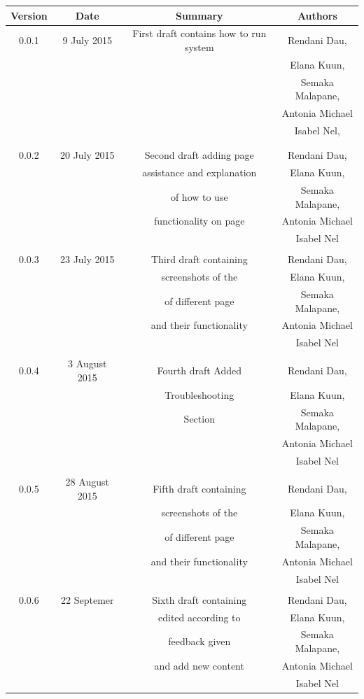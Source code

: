 \documentclass[a4paper,12pt]{report}
\begin{document}
\begin{table}[h!]
\centering
 \begin{tabular}{||c c c c||} 
 \hline
 \textbf{Version} & \textbf{Date} & \textbf{Summary} & \textbf{Authors} \\ [0.5ex] 
 \hline\hline
 0.0.1 & 9 July 2015 &  First draft contains how to run system  & Rendani Dau, \\ & & & Elana Kuun, \\ & & & Semaka Malapane, \\ & & & Antonia Michael \\ & & & Isabel Nel, \\ & & & \\
 \hline 
 & & & \\
 0.0.2 & 20 July 2015 &  Second draft adding page  & Rendani Dau, \\ & & assistance and explanation & Elana Kuun, \\ & & of how to use & Semaka Malapane, \\ & & functionality on page &  Antonia Michael \\ & & & Isabel Nel \\   [1ex]  
 \hline 
 & & & \\
 0.0.3& 23 July 2015 &  Third draft containing  & Rendani Dau, \\ & & screenshots of the & Elana Kuun, \\ & & of different page & Semaka Malapane, \\ & & and their functionality &  Antonia Michael \\ & & & Isabel Nel \\   [1ex]  
 \hline
 & & & \\
 0.0.4& 3 August 2015 &  Fourth draft Added  & Rendani Dau, \\ & & Troubleshooting & Elana Kuun, \\ & & Section & Semaka Malapane, \\ & &  &  Antonia Michael \\ & & & Isabel Nel \\   [1ex]  
  \hline 
 & & & \\
 0.0.5& 28 August 2015 &  Fifth draft containing  & Rendani Dau, \\ & & screenshots of the & Elana Kuun, \\ & & of different page & Semaka Malapane, \\ & & and their functionality &  Antonia Michael \\ & & & Isabel Nel \\   [1ex]  
  \hline 
 & & & \\
 0.0.6& 22 Septemer &  Sixth draft containing  & Rendani Dau, \\ & & edited according to & Elana Kuun, \\ & & feedback given & Semaka Malapane, \\ & & and add new content &  Antonia Michael \\ & & & Isabel Nel \\   [1ex]  
\hline
 \end{tabular}
\end{table}
\end{document}
